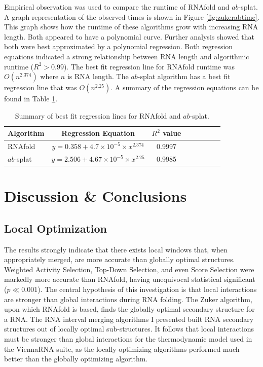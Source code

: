 \documentclass{cshonours}
\begin{document}
Empirical observation was used to compare the runtime of RNAfold and $ab$-splat. A graph representation of the observed times is shown in Figure \ref{fig:zukerabtime}. This graph shows how the runtime of these algorithms grow with increasing RNA length. Both appeared to have a polynomial curve. Further analysis showed that both were best approximated by a polynomial regression. Both regression equations indicated a strong relationship between RNA length and algorithmic runtime ($R^2 > 0.99$). The best fit regression line for RNAfold runtime was $O(n^{2.374})$ where $n$ is RNA length. The $ab$-splat algorithm has a best fit regression line that was $O(n^{2.25})$. A summary of the regression equations can be found in Table \ref{tab:algorithmtimeregression}.


\begin{table}
\centering
\begin{tabular}{l*{6}{c}r}
Algorithm	& Regression Equation & $R^2$ value \\
\hline
RNAfold &  $y=0.358+4.7 \times 10^{-5} \times x^{2.374}$    &    0.9997    \\
$ab$-splat & $y=2.506+ 4.67\times 10 ^{-5} \times x^{2.25}$    &    0.9985  \\
\end{tabular}

\caption{Summary of best fit regression lines for RNAfold and $ab$-splat.}
\label{tab:algorithmtimeregression}
\end{table}

\chapter{Discussion \& Conclusions}

\section{Local Optimization}
\label{sec:localopt}
The results strongly indicate that there exists local windows that, when appropriately merged, are more accurate than globally optimal structures. Weighted Activity Selection, Top-Down Selection, and even Score Selection were markedly more accurate than RNAfold, having unequivocal statistical significant ($p \ll 0.001$). The central hypothesis of this investigation is that local interactions are stronger than global interactions during RNA folding. The Zuker algorithm, upon which RNAfold is based, finds the globally optimal secondary structure for a RNA. The RNA interval merging algorithms I presented built RNA secondary structures out of locally optimal sub-structures. It follows that local interactions must be stronger than global interactions for the thermodynamic model used in the ViennaRNA suite, as the locally optimizing algorithms performed much better than the globally optimizing algorithm.
\end{document}
